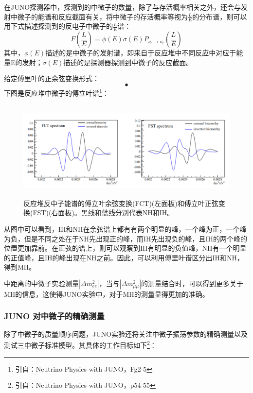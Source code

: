 \documentclass[10pt,a4paper]{article}
\begin{document}
在JUNO探测器中，探测到的中微子的数量，除了与存活概率相关之外，还会与发射中微子的能谱和反应截面有关，将中微子的存活概率等视为$\frac{L}{E}$的分布谱，则可以用下式描述探测到的反电子中微子的$\frac{L}{E}$谱：
\begin{equation}
F(\frac{L}{E})=\phi(E)\sigma(E)P_{\bar{\nu_e}\rightarrow\bar{\nu_e}}(\frac{L}{E})
\end{equation}
其中，$\phi(E)$描述的是中微子的发射谱，即来自于反应堆中不同反应中对应于能量E的发射；$\sigma(E)$描述的是探测器探测到中微子的反应截面。

给定傅里叶的正余弦变换形式：
\begin{equation}
•
\end{equation}
下图是反应堆中微子的傅立叶谱\footnote{引自：Neutrino Physics with JUNO，Fg2-5}：

\begin{figure}[ht]
 \centering
 \includegraphics[height=5cm]{images/傅里叶图谱.png}
 \caption{反应堆反中子能谱的傅立叶余弦变换(FCT)(左面板)和傅立叶正弦变换(FST)(右面板)。黑线和蓝线分别代表NH和IH。}
 \label{fig:singleblock}
\end{figure}

从图中可以看到，IH和NH在余弦谱上都有有两个明显的峰，一个峰为正，一个峰为负，但是不同之处在于NH先出现正的峰，而IH先出现负的峰，且IH的两个峰的位置更加靠前。在正弦的谱上，则可以观察到IH有明显的负值峰，NH有一个明显的正值峰，且IH的峰出现在NH之前。因此，可以利用傅里叶谱区分出IH和NH，得到MH。

中距离的中微子实验测量$|\Delta{m_{ee}^2}|$，当与$|\Delta{m_{\mu\mu}^2}|$的测量结合时，可以得到更多关于MH的信息，这使得JUNO实验中，对于MH的测量显得更加的准确。

\subsubsection{JUNO 对中微子的精确测量}\label{sub:logicinter}

除了中微子的质量顺序问题，JUNO实验还将关注中微子振荡参数的精确测量以及测试三中微子标准模型。其具体的工作目标如下\footnote{引自：Neutrino Physics with JUNO，p54-55}：
\end{document}
